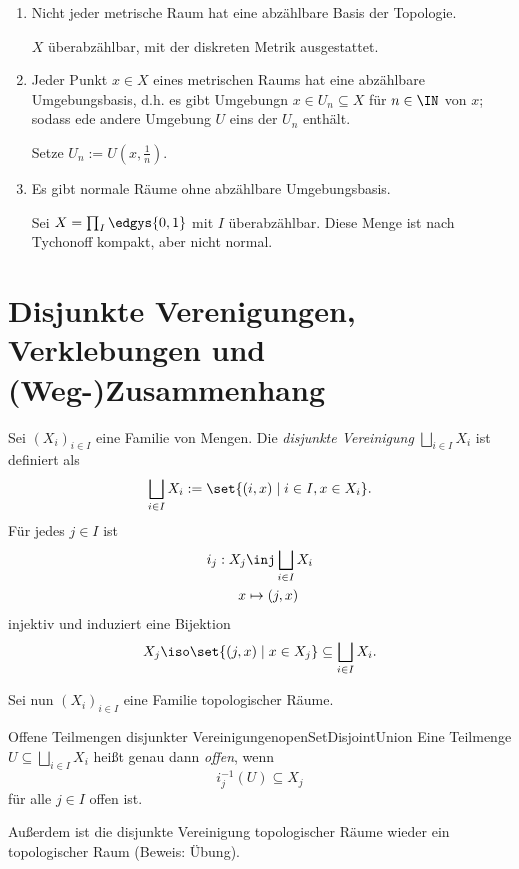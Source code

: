 \documentclass[language=ngerman]{TemplateLecture} %
\begin{document}
\begin{remark}
    \begin{enumerate}[$(i)$]
        \item Nicht jeder metrische Raum hat eine abzählbare Basis der Topologie.
        \begin{example}
            $X$ überabzählbar, mit der diskreten Metrik ausgestattet.
        \end{example}
        \item Jeder Punkt $x \in X$ eines metrischen Raums hat eine abzählbare Umgebungsbasis, d.h. es gibt Umgebungn $x \in U_n \subseteq X$ für $n \in \IN$ von $x$; sodass ede andere Umgebung $U$ eins der $U_n$ enthält.
        \begin{example}
            Setze $U_n := U(x, \frac{1}{n})$.
        \end{example}
        \item Es gibt normale Räume ohne abzählbare Umgebungsbasis.
        \begin{example}
            Sei $X = \prod_I \edgys{0,1}$ mit $I$ überabzählbar. Diese Menge ist nach Tychonoff kompakt, aber nicht normal.
        \end{example}
    \end{enumerate}
\end{remark}


\chapter{Disjunkte Verenigungen, Verklebungen und (Weg-)Zusammenhang}

Sei $(X_i)_{i \in I}$ eine Familie von Mengen. Die \emph{disjunkte Vereinigung} $\bigsqcup_{i \in I} X_i$ ist definiert als 
\begin{equation*}
    \bigsqcup_{i \in I} X_i := \set{(i, x) \mid i \in I, x \in X_i}.
\end{equation*}
Für jedes $j \in I$ ist 
\begin{align*}
    i_j: X_j &\inj \bigsqcup_{i \in I} X_i \\
    x &\mapsto (j,x)
\end{align*}
injektiv und induziert eine Bijektion 
\begin{equation*}
    X_j \iso \set{(j,x) \mid x \in X_j} \subseteq \bigsqcup_{i \in I} X_i.
\end{equation*}

Sei nun $(X_i)_{i \in I}$ eine Familie topologischer Räume.
\begin{defi}{Offene Teilmengen disjunkter Vereinigungen}{openSetDisjointUnion}
    Eine Teilmenge $U \subseteq \bigsqcup_{i \in I} X_i$ heißt genau dann \emph{offen}, wenn 
    \begin{equation*}
        i_j^{-1}(U) \subseteq X_j
    \end{equation*}
    für alle $j \in I$ offen ist.
\end{defi}
Außerdem ist die disjunkte Vereinigung topologischer Räume wieder ein topologischer Raum (Beweis: Übung).
\end{document}
